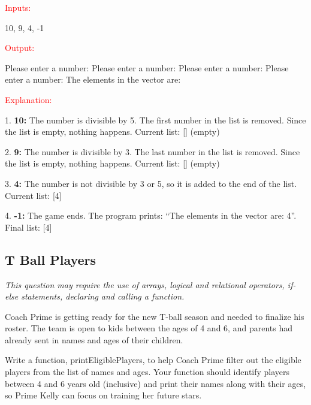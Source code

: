 \begin{sample}
\textcolor{red}{Inputs:}

10, 9, 4, -1

\textcolor{red}{Output:}

Please enter a number: \newline
Please enter a number: \newline
Please enter a number: \newline
Please enter a number: \newline
The elements in the vector are: 

\textcolor{red}{Explanation:}

1. \textbf{10:} The number is divisible by 5. The first number in the list is removed. Since the list is empty, nothing happens. \newline
   Current list: [] (empty) \newline

2. \textbf{9:} The number is divisible by 3. The last number in the list is removed. Since the list is empty, nothing happens. \newline
   Current list: [] (empty) \newline

3. \textbf{4:} The number is not divisible by 3 or 5, so it is added to the end of the list. \newline
   Current list: [4] \newline

4. \textbf{-1:} The game ends. The program prints: ``The elements in the vector are: 4''. \newline
   Final list: [4]
\end{sample}


\subsection{T Ball Players} 
\textit{This question may require the use of arrays, logical and relational operators, if-else statements, declaring and calling a function.}

Coach Prime is getting ready for the new T-ball season and needed to finalize his roster. The team is open to kids between the ages of 4 and 6, and parents had already sent in names and ages of their children. 

Write a function, printEligiblePlayers, to help Coach Prime filter out the eligible players from the list of names and ages. Your function should identify players between 4 and 6 years old (inclusive) and print their names along with their ages, so Prime Kelly can focus on training her future stars.

